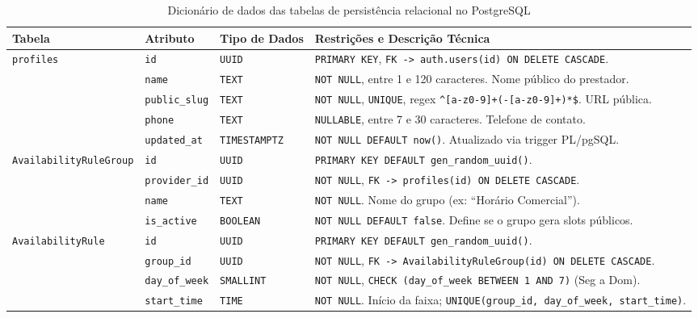 \documentclass[12pt,a4paper]{article}
\begin{document}
\begin{table}[hbt]
\centering
\caption{Dicionário de dados das tabelas de persistência relacional no PostgreSQL}
\label{quadro:dicionario_dados}
\scriptsize
\renewcommand{\arraystretch}{1.15}
\begin{tabularx}{\textwidth}{|l|l|l|X|}
\hline
\textbf{Tabela} & \textbf{Atributo} & \textbf{Tipo de Dados} & \textbf{Restrições e Descrição Técnica} \\ \hline
\multirow{5}{*}{\texttt{profiles}} 
 & \texttt{id} & \texttt{UUID} & \texttt{PRIMARY KEY}, \texttt{FK -> auth.users(id) ON DELETE CASCADE}. \\
 & \texttt{name} & \texttt{TEXT} & \texttt{NOT NULL}, entre 1 e 120 caracteres. Nome público do prestador. \\
 & \texttt{public\_slug} & \texttt{TEXT} & \texttt{NOT NULL}, \texttt{UNIQUE}, regex \texttt{\^{}[a-z0-9]+(-[a-z0-9]+)*\$}. URL pública. \\
 & \texttt{phone} & \texttt{TEXT} & \texttt{NULLABLE}, entre 7 e 30 caracteres. Telefone de contato. \\
 & \texttt{updated\_at} & \texttt{TIMESTAMPTZ} & \texttt{NOT NULL DEFAULT now()}. Atualizado via trigger PL/pgSQL. \\ \hline
\multirow{4}{*}{\texttt{AvailabilityRuleGroup}} 
 & \texttt{id} & \texttt{UUID} & \texttt{PRIMARY KEY DEFAULT gen\_random\_uuid()}. \\
 & \texttt{provider\_id} & \texttt{UUID} & \texttt{NOT NULL}, \texttt{FK -> profiles(id) ON DELETE CASCADE}. \\
 & \texttt{name} & \texttt{TEXT} & \texttt{NOT NULL}. Nome do grupo (ex: ``Horário Comercial''). \\
 & \texttt{is\_active} & \texttt{BOOLEAN} & \texttt{NOT NULL DEFAULT false}. Define se o grupo gera slots públicos. \\ \hline
\multirow{5}{*}{\texttt{AvailabilityRule}} 
 & \texttt{id} & \texttt{UUID} & \texttt{PRIMARY KEY DEFAULT gen\_random\_uuid()}. \\
 & \texttt{group\_id} & \texttt{UUID} & \texttt{NOT NULL}, \texttt{FK -> AvailabilityRuleGroup(id) ON DELETE CASCADE}. \\
 & \texttt{day\_of\_week} & \texttt{SMALLINT} & \texttt{NOT NULL}, \texttt{CHECK (day\_of\_week BETWEEN 1 AND 7)} (Seg a Dom). \\
 & \texttt{start\_time} & \texttt{TIME} & \texttt{NOT NULL}. Início da faixa; \texttt{UNIQUE(group\_id, day\_of\_week, start\_time)}. \\

\end{tabularx}
\end{table}
\end{document}
